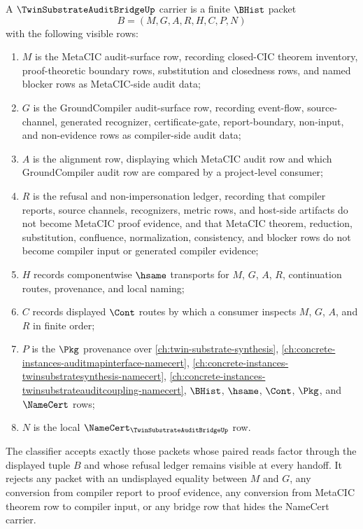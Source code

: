 \begin{definition}
\label{def:twin-substrate-audit-bridge-carrier}
A $\TwinSubstrateAuditBridgeUp$ carrier is a finite $\BHist$ packet
$$
B=(M,G,A,R,H,C,P,N)
$$
with the following visible rows:
\begin{enumerate}
\item $M$ is the MetaCIC audit-surface row, recording closed-CIC theorem inventory, proof-theoretic boundary rows, substitution and closedness rows, and named blocker rows as MetaCIC-side audit data;
\item $G$ is the GroundCompiler audit-surface row, recording event-flow, source-channel, generated recognizer, certificate-gate, report-boundary, non-input, and non-evidence rows as compiler-side audit data;
\item $A$ is the alignment row, displaying which MetaCIC audit row and which GroundCompiler audit row are compared by a project-level consumer;
\item $R$ is the refusal and non-impersonation ledger, recording that compiler reports, source channels, recognizers, metric rows, and host-side artifacts do not become MetaCIC proof evidence, and that MetaCIC theorem, reduction, substitution, confluence, normalization, consistency, and blocker rows do not become compiler input or generated compiler evidence;
\item $H$ records componentwise $\hsame$ transports for $M$, $G$, $A$, $R$, continuation routes, provenance, and local naming;
\item $C$ records displayed $\Cont$ routes by which a consumer inspects $M$, $G$, $A$, and $R$ in finite order;
\item $P$ is the $\Pkg$ provenance over \autoref{ch:twin-substrate-synthesis}, \autoref{ch:concrete-instances-auditmapinterface-namecert}, \autoref{ch:concrete-instances-twinsubstratesynthesis-namecert}, \autoref{ch:concrete-instances-twinsubstrateauditcoupling-namecert}, $\BHist$, $\hsame$, $\Cont$, $\Pkg$, and $\NameCert$ rows;
\item $N$ is the local $\NameCert_{\TwinSubstrateAuditBridgeUp}$ row.
\end{enumerate}
The classifier accepts exactly those packets whose paired reads factor through the displayed tuple $B$ and whose refusal ledger remains visible at every handoff. It rejects any packet with an undisplayed equality between $M$ and $G$, any conversion from compiler report to proof evidence, any conversion from MetaCIC theorem row to compiler input, or any bridge row that hides the NameCert carrier.
\end{definition}

